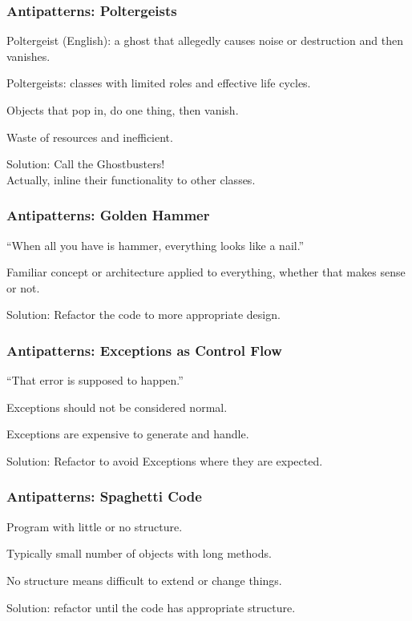 \begin{frame}
\frametitle{Antipatterns: Poltergeists}
\begin{changemargin}{1cm}
Poltergeist (English): a ghost that allegedly causes noise or destruction and then vanishes.

Poltergeists: classes with limited roles and effective life cycles.

Objects that pop in, do one thing, then vanish.

Waste of resources and inefficient.

Solution: Call the Ghostbusters!\\
\quad\quad Actually, inline their functionality to other classes.


\end{changemargin}
\end{frame}

\begin{frame}
\frametitle{Antipatterns: Golden Hammer}
\begin{changemargin}{1cm}
``When all you have is hammer, everything looks like a nail.''

Familiar concept or architecture applied to everything, whether that makes sense or not.

Solution: Refactor the code to more appropriate design.

\end{changemargin}
\end{frame}

\begin{frame}
\frametitle{Antipatterns: Exceptions as Control Flow}
\begin{changemargin}{1cm}
``That error is supposed to happen.''

Exceptions should not be considered normal.

Exceptions are expensive to generate and handle.

Solution: Refactor to avoid Exceptions where they are expected.

\end{changemargin}
\end{frame}


\begin{frame}
\frametitle{Antipatterns: Spaghetti Code}
\begin{changemargin}{1cm}
Program with little or no structure.

Typically small number of objects with long methods.

No structure means difficult to extend or change things.

Solution: refactor until the code has appropriate structure.


\end{changemargin}
\end{frame}

